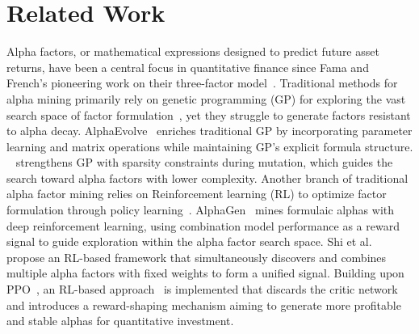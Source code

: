 \section{Related Work}
Alpha factors, or mathematical expressions designed to predict future asset returns, have been a central focus in quantitative finance since Fama and French's pioneering work on their three-factor model~\cite{fama1992cross}. Traditional methods for alpha mining primarily rely on genetic programming (GP) for exploring the vast search space of factor formulation~\cite{lin2019revisiting, 10.1145/1830483.1830584,zhaofan2022genetic,patil2023ai}, yet they struggle to generate factors resistant to alpha decay. 
%
AlphaEvolve~\cite{alphaevolve} enriches traditional GP by incorporating parameter learning and matrix operations while maintaining GP's explicit formula structure. ~\cite{shen2023mining} strengthens GP with sparsity constraints during mutation, which guides the search toward alpha factors with lower complexity. 
%
Another branch of traditional alpha factor mining relies on Reinforcement learning (RL) to optimize factor formulation through policy learning~\cite{alphagen,shi2024alphaforgeframeworkdynamicallycombine,finrl}. AlphaGen~\cite{alphagen} mines formulaic alphas with deep reinforcement learning, using combination model performance as a reward signal to guide exploration within the alpha factor search space. Shi et al.~\cite{shi2024alphaforgeframeworkdynamicallycombine} propose an RL-based framework that simultaneously discovers and combines multiple alpha factors with fixed weights to form a unified signal. 
%
Building upon PPO~\cite{ppo}, an RL-based approach~\cite{zhao2024quantfactorreinforceminingsteady} is implemented that discards the critic network and introduces a reward-shaping mechanism aiming to generate more profitable and stable alphas for quantitative investment. 
%

